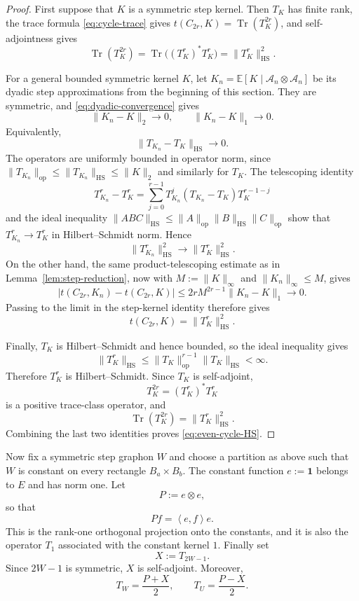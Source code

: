 \documentclass[11pt]{article}
\newcommand{\one}{\mathbf{1}}
\newcommand{\ip}[2]{\left\langle #1,#2\right\rangle}
\newcommand{\Tr}{\operatorname{Tr}}
\newcommand{\op}{\mathrm{op}}
\newcommand{\HS}{\mathrm{HS}}
\begin{document}
\begin{proof}
First suppose that $K$ is a symmetric step kernel.  Then $T_K$ has
finite rank, the trace formula \eqref{eq:cycle-trace} gives
$t(C_{2r},K)=\Tr(T_K^{2r})$, and self-adjointness gives
\[
  \Tr(T_K^{2r})
  =\Tr\bigl((T_K^r)^*T_K^r\bigr)
  =\|T_K^r\|_{\HS}^2.
\]

For a general bounded symmetric kernel $K$, let
$K_n=\mathbb E[K\mid\mathcal A_n\otimes\mathcal A_n]$ be its dyadic
step approximations from the beginning of this section.  They are
symmetric, and \eqref{eq:dyadic-convergence} gives
\[
  \|K_n-K\|_2\to0,
  \qquad
  \|K_n-K\|_1\to0.
\]
Equivalently,
\[
  \|T_{K_n}-T_K\|_{\HS}\to0.
\]
The operators are uniformly bounded in operator norm, since
$\|T_{K_n}\|_{\op}\le\|T_{K_n}\|_{\HS}\le\|K\|_2$ and similarly for
$T_K$.  The telescoping identity
\[
  T_{K_n}^r-T_K^r
  =\sum_{j=0}^{r-1}
  T_{K_n}^{j}(T_{K_n}-T_K)T_K^{r-1-j}
\]
and the ideal inequality
$\|ABC\|_{\HS}\le\|A\|_{\op}\|B\|_{\HS}\|C\|_{\op}$ show that
$T_{K_n}^r\to T_K^r$ in Hilbert--Schmidt norm.  Hence
\[
  \|T_{K_n}^r\|_{\HS}^2\longrightarrow\|T_K^r\|_{\HS}^2.
\]
On the other hand, the same product-telescoping estimate as in
Lemma~\ref{lem:step-reduction}, now with
$M:=\|K\|_\infty$ and $\|K_n\|_\infty\le M$, gives
\[
  |t(C_{2r},K_n)-t(C_{2r},K)|
  \le 2rM^{2r-1}\|K_n-K\|_1
  \longrightarrow0.
\]
Passing to the limit in the step-kernel identity therefore gives
\[
  t(C_{2r},K)=\|T_K^r\|_{\HS}^2.
\]

Finally, $T_K$ is Hilbert--Schmidt and hence bounded, so the ideal
inequality gives
\[
  \|T_K^r\|_{\HS}
  \le\|T_K\|_{\op}^{r-1}\|T_K\|_{\HS}<\infty.
\]
Therefore $T_K^r$ is Hilbert--Schmidt.  Since $T_K$ is self-adjoint,
\[
  T_K^{2r}=(T_K^r)^*T_K^r
\]
is a positive trace-class operator, and
\[
  \Tr(T_K^{2r})=\|T_K^r\|_{\HS}^2.
\]
Combining the last two identities proves \eqref{eq:even-cycle-HS}.
\end{proof}

Now fix a symmetric step graphon $W$ and choose a partition as above
such that $W$ is constant on every rectangle $B_a\times B_b$.  The
constant function $e:=\one$ belongs to $E$ and has norm one.  Let
\[
  P:=e\otimes e,
\]
so that
\[
  Pf=\ip{e}{f}e.
\]
This is the rank-one orthogonal projection onto the constants, and it is
also the operator $T_1$ associated with the constant kernel $1$.
Finally set
\[
  X:=T_{2W-1}.
\]
Since $2W-1$ is symmetric, $X$ is self-adjoint.  Moreover,
\begin{equation}
  T_W=\frac{P+X}{2},
  \qquad
  T_U=\frac{P-X}{2}.
  \label{eq:color-coordinate}
\end{equation}
\end{document}
